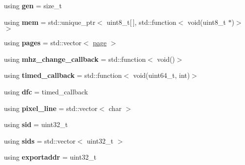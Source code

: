 \begin{DoxyCompactItemize}
\item 
\mbox{\label{namespaceeka2l1_a7287791fd7455c9e901ee76ac7a0d8da}} 
using {\bfseries gen} = size\+\_\+t
\item 
\mbox{\label{namespaceeka2l1_a5715fc1fb7ae495353522826f9fddf7c}} 
using {\bfseries mem} = std\+::unique\+\_\+ptr$<$ uint8\+\_\+t\mbox{[}$\,$\mbox{]}, std\+::function$<$ void(uint8\+\_\+t $\ast$)$>$ $>$
\item 
\mbox{\label{namespaceeka2l1_ad0929106c76b10f2f46049f27d0d1795}} 
using {\bfseries pages} = std\+::vector$<$ \mbox{\hyperlink{structeka2l1_1_1page}{page}} $>$
\item 
\mbox{\label{namespaceeka2l1_ad5283fd1053b7563e42947bf41925e3a}} 
using {\bfseries mhz\+\_\+change\+\_\+callback} = std\+::function$<$ void()$>$
\item 
\mbox{\label{namespaceeka2l1_ac5817a1bf1d20dc9111356563d7add75}} 
using {\bfseries timed\+\_\+callback} = std\+::function$<$ void(uint64\+\_\+t, int)$>$
\item 
\mbox{\label{namespaceeka2l1_ae8b63418d3b288571fe6531b46f632ce}} 
using {\bfseries dfc} = timed\+\_\+callback
\item 
\mbox{\label{namespaceeka2l1_ad9210d2bd226941021f693f93a058894}} 
using {\bfseries pixel\+\_\+line} = std\+::vector$<$ char $>$
\item 
\mbox{\label{namespaceeka2l1_a5449913925af059886712a6ef89d4f56}} 
using {\bfseries sid} = uint32\+\_\+t
\item 
\mbox{\label{namespaceeka2l1_af1a8334dd466540832bb9019c5772b62}} 
using {\bfseries sids} = std\+::vector$<$ uint32\+\_\+t $>$
\item 
\mbox{\label{namespaceeka2l1_a57d41ebd02de687744797efb063db71d}} 
using {\bfseries exportaddr} = uint32\+\_\+t
\item 
\mbox{\label{namespaceeka2l1_a28b8218c5b0bf9e709bb6158189e8a4b}} 

\end{DoxyCompactItemize}

